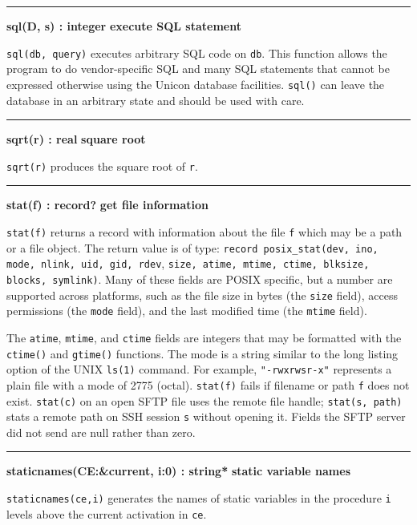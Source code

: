 \bigskip\hrule\vspace{0.1cm}
\noindent
{\bf sql(D, s) : integer } \hfill {\bf execute SQL statement}

\noindent
{}\texttt{sql(db, query)} executes arbitrary SQL code on
\texttt{db}. This function allows the program to do vendor-specific SQL
and many SQL statements that cannot be expressed otherwise using the
Unicon database facilities. \texttt{sql()} can leave the database in an
arbitrary state and should be used with care.

\bigskip\hrule\vspace{0.1cm}
\noindent
{\bf sqrt(r) : real } \hfill {\bf square root}

\noindent
{}\texttt{sqrt(r)} produces the square root of
\texttt{r}.

\bigskip\hrule\vspace{0.1cm}
\noindent
{\bf stat(f) : record? } \hfill {\bf get file information}

\noindent
{}\texttt{stat(f)} returns a record
with information about the file \texttt{f} which may be a path or a
file object. The return value is of type:
\texttt{record posix\_stat(dev, ino, mode, nlink, uid, gid, rdev},
\texttt{size, atime, mtime, ctime, blksize, blocks, symlink)}.
Many of these fields are POSIX
specific, but a number are supported across platforms, such as the
file size in bytes (the \texttt{size} field), access
permissions (the \texttt{mode} field), and the last modified time (the
\texttt{mtime} field).

The \texttt{atime}, \texttt{mtime}, and \texttt{ctime} fields are
integers that may be formatted with the \texttt{ctime()} and
\texttt{gtime()} functions. The mode is a string similar to the long
listing option of the UNIX \texttt{ls(1)} command. For example,
\texttt{"-rwxrwsr-x"} represents a plain
file with a mode of 2775 (octal). \texttt{stat(f)} fails if filename or
path \texttt{f} does not exist. \texttt{stat(c)} on an open SFTP file
uses the remote file handle; \texttt{stat(s, path)} stats a remote path
on SSH session \texttt{s} without opening it. Fields the SFTP server
did not send are null rather than zero.

\bigskip\hrule\vspace{0.1cm}
\noindent
{\bf staticnames(CE:\&current, i:0) : string* } \hfill {\bf static variable names}

\noindent
{}\texttt{staticnames(ce,i)} generates the names of static
variables in the procedure \texttt{i} levels above the current
activation in \texttt{ce}.

